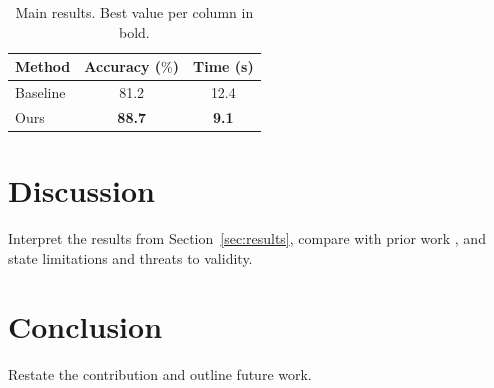 \documentclass[11pt]{article}
\begin{document}
\begin{table}[t]
  \centering
  \caption{Main results. Best value per column in bold.}
  \label{tab:results}
  \begin{tabular}{lcc}
    \toprule
    Method & Accuracy ($\%$) & Time (s) \\
    \midrule
    Baseline      & 81.2 & 12.4 \\
    Ours          & \textbf{88.7} & \textbf{9.1} \\
    \bottomrule
  \end{tabular}
\end{table}


\section{Discussion}
\label{sec:discussion}
Interpret the results from Section~\ref{sec:results}, compare with prior work
\citep{smith2020example, brown2021inproc}, and state limitations and threats to
validity.

\section{Conclusion}
\label{sec:conclusion}
Restate the contribution and outline future work.



\end{document}
